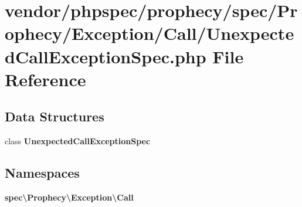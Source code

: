 \section{vendor/phpspec/prophecy/spec/\+Prophecy/\+Exception/\+Call/\+Unexpected\+Call\+Exception\+Spec.php File Reference}
\label{_unexpected_call_exception_spec_8php}
\subsection*{Data Structures}
\begin{DoxyCompactItemize}
\item 
class {\bf Unexpected\+Call\+Exception\+Spec}
\end{DoxyCompactItemize}
\subsection*{Namespaces}
\begin{DoxyCompactItemize}
\item 
 {\bf spec\textbackslash{}\+Prophecy\textbackslash{}\+Exception\textbackslash{}\+Call}
\end{DoxyCompactItemize}
